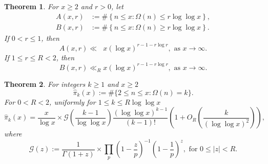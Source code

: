 \documentclass[11pt,reqno,a4letter]{article}
\newcommand{\hlocalref}[1]{\hyperref[#1]{\ref{#1}}}
\numberwithin{equation}{section}
\numberwithin{figure}{section}
\numberwithin{table}{section}
\newcommand{\cf}{\textit{cf.\ }}
\theoremstyle{plain}
\newtheorem{theorem}{Theorem}
\numberwithin{theorem}{section}
\theoremstyle{definition}
\begin{document}
\begin{theorem} 
\label{theorem_MV_Thm7.20-init_stmt} 
For $x \geq 2$ and $r > 0$, let 
\begin{align*} 
A(x, r) & := \#\left\{n \leq x: \Omega(n) \leq r \log\log x\right\}, \\ 
B(x, r) & := \#\left\{n \leq x: \Omega(n) \geq r \log\log x\right\}. 
\end{align*} 
If $0 < r \leq 1$, then 
\[
A(x, r) \ll\phantom{_R} x (\log x)^{r-1 - r\log r}, \text{ as } x \rightarrow \infty. 
\]
If $1 \leq r \leq R < 2$, then 
\[
B(x, r) \ll_R x (\log x)^{r-1-r \log r}, \text{ as } x \rightarrow \infty. 
\]
\end{theorem} 


\begin{theorem}
\label{theorem_HatPi_ExtInTermsOfGz} 
For integers $k \geq 1$ and $x \geq 2$ 
$$\widehat{\pi}_k(x) := \#\{2 \leq n \leq x: \Omega(n)=k\}.$$ 
For $0 < R < 2$, uniformly for $1 \leq k \leq R \log\log x$ 
\[
\widehat{\pi}_k(x) = \frac{x}{\log x} \times \mathcal{G}\left(\frac{k-1}{\log\log x}\right) 
     \frac{(\log\log x)^{k-1}}{(k-1)!} \left(1 + O_R\left(\frac{k}{(\log\log x)^2}\right)\right), 
\]
where 
\[
\mathcal{G}(z) := \frac{1}{\Gamma(1+z)} \times 
	\prod_p \left(1-\frac{z}{p}\right)^{-1} \left(1-\frac{1}{p}\right)^z, 
	\text{ for } 0 \leq |z| < R. 
\]
\end{theorem} 
\end{document}
